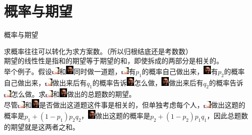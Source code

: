 \documentclass{beamer}
\begin{document}
	\section{概率与期望}
	\begin{frame}{概率与期望}
		
		求概率往往可以转化为求方案数。（所以归根结底还是考数数）
		\\
		
		期望的线性性是指和的期望等于期望的和，即使拆成的两部分是相关的。
		\pause\\
		
		举个例子。假设\includegraphics[width=0.4cm]{o_ji.jpg}和\includegraphics[width=0.4cm]{o_mao.png}同时做一道题，\includegraphics[width=0.4cm]{o_ji.jpg}有$p_1$的概率自己做出来，\includegraphics[width=0.4cm]{o_mao.png}有$p_2$的概率自己做出来，\includegraphics[width=0.4cm]{o_ji.jpg}做出来后有$q_1$的概率告诉\includegraphics[width=0.4cm]{o_mao.png}怎么做，\includegraphics[width=0.4cm]{o_mao.png}做出来后有$q_2$的概率告诉\includegraphics[width=0.4cm]{o_ji.jpg}怎么做。求\includegraphics[width=0.4cm]{o_ji.jpg}和\includegraphics[width=0.4cm]{o_mao.png}做出的总题数的期望。
		\pause\\
		
		尽管\includegraphics[width=0.4cm]{o_ji.jpg}和\includegraphics[width=0.4cm]{o_mao.png}是否做出这道题这件事是相关的，但单独考虑每个人，\includegraphics[width=0.4cm]{o_ji.jpg}做出这题的概率是$p_1+(1-p_1)p_2q_2$，\includegraphics[width=0.4cm]{o_mao.png}做出这题的概率是$p_2+(1-p_2)p_1q_1$，因此总题数的期望就是这两者之和。
	\end{frame}
\end{document}

